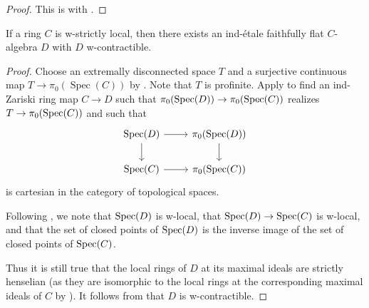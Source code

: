 \begin{proof}
  This is  with .
\end{proof}

\begin{lemma}
  If a ring \(C\) is w-strictly local, then there exists an ind-étale faithfully flat \(C\)-algebra \(D\) with \(D\) w-contractible.
  \label{thm:ind-etale-w-contractible-cover-of-w-strictly-local}
\end{lemma}

\begin{proof}
  Choose an extremally disconnected space $T$ and a surjective continuous map $T \to \pi_0(\operatorname{Spec}(C))$ by . Note that $T$ is profinite.
  Apply  to find an ind-Zariski ring map $C \to D$ such that $\pi_0(\operatorname{Spec} (D)) \to \pi_0(\operatorname{Spec} (C))$ realizes $T \to \pi_0(\operatorname{Spec} (C))$ and such that
  \[
  \begin{tikzcd}
  \operatorname{Spec}(D) \arrow[r] \arrow[d] & \pi_0(\operatorname{Spec}(D)) \arrow[d] \\
  \operatorname{Spec}(C) \arrow[r] & \pi_0(\operatorname{Spec}(C))
  \end{tikzcd}
  \]
  is cartesian in the category of topological spaces.

  Following , we note that $\operatorname{Spec} (D)$ is w-local, that $\operatorname{Spec} (D) \to \operatorname{Spec} (C)$ is w-local, and that the set of closed points of $\operatorname{Spec} (D)$ is the inverse image of the set of closed points of $\operatorname{Spec} (C)$.

  Thus it is still true that the local rings of $D$ at its maximal ideals are strictly henselian (as they are isomorphic to the local rings at the corresponding maximal ideals of $C$ by ). It follows from  that $D$ is w-contractible.
\end{proof}

